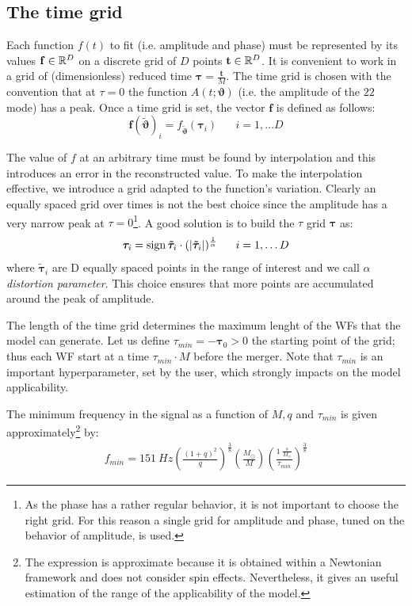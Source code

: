 \subsection{The time grid}
Each function $f(t)$ to fit (i.e. amplitude and phase) must be represented by its values $\mathbf{f} \in \mathbb{R}^D$ on a discrete grid of $D$ points $\mathbf{t} \in \mathbb{R}^D$.
It is convenient to work in a grid of (dimensionless) reduced time $\boldsymbol{\tau} = \frac{\mathbf{t}}{M}$.
The time grid is chosen with the convention that at $\tau=0$ the function $A(t;\boldsymbol{\vartheta})$ (i.e. the amplitude of the ${22}$ mode) has a peak.
Once a time grid is set, the vector $\mathbf{f}$ is defined as follows:
\begin{equation}
	\mathbf{f}({\tilde{\boldsymbol{\vartheta}}})_i = f_{{\tilde{\boldsymbol{\vartheta}}}}(\boldsymbol{\tau}_i) \;\;\;\;\;\; i = 1, \ldots D
\end{equation}
\par
The value of $f$ at an arbitrary time must be found by interpolation and this introduces an error in the reconstructed value.
To make the interpolation effective, we introduce a grid adapted to the
  function's variation.
Clearly an equally spaced grid over times is not the best choice since the amplitude has a very narrow peak at $\tau=0$\footnote{As the phase has a rather regular behavior, it is not important to choose the right grid. For this reason a single grid for amplitude and phase, tuned on the behavior of amplitude, is used.}.
A good solution is to build the $\tau$ grid ${\boldsymbol{\tau}}$ as:
\begin{equation} \label{eq:tau_grid}
	{\boldsymbol{\tau}}_i = \operatorname{sign}{\boldsymbol{\tilde{\tau}}_i} \cdot (|\boldsymbol{\tilde{\tau}}_i|)^{\frac{1}{\alpha}} \;\;\;\;\;\; i = 1, \ldots D
\end{equation}
where $\boldsymbol{\tilde{\tau}}_i$ are D equally spaced points in the range of interest and we call $\alpha$ \textit{distortion parameter}.
This choice ensures that more points are accumulated around the peak of amplitude.
\par
The length of the time grid determines the maximum lenght of the WFs that the model can generate.
Let us define $\tau_{min} = -{\boldsymbol{\tau}}_0 > 0 $ the starting point of the grid; thus each WF start at a time $\tau_{min}\cdot M$ before the merger.
Note that $\tau_{min}$ is an important hyperparameter, set by the user, which strongly impacts on the model applicability.
\par
The minimum frequency in the signal as a function of $M, q$ and $\tau_{min}$ is given approximately\footnote{The expression is approximate because it is obtained within a Newtonian framework and does not consider spin effects.
Nevertheless, it gives an useful estimation of the range of the applicability of the model.}
by:
\begin{align}\label{eq:f_min}
	f_{min} = \SI{151}{Hz}  \left( \frac{(1+q)^2}{q} \right)^{\frac{3}{8}}  \left( \frac{M_\odot}{M} \right)  \left(\frac{\SI{1}{ \frac{s}{M_\odot}}}{\tau_{min}} \right)^{\frac{3}{8}}  
\end{align} 



